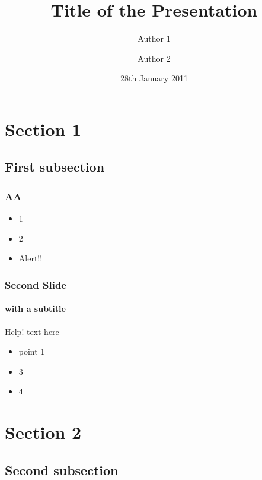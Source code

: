 \documentclass{beamer}
\title[Short Title]{Title of the Presentation}
\author[Auth. 1 \and Auth.2]{Author 1 \and Author 2}
\institute[UCL]{%
  Department of Statistical Science \\ %
  University College London
}
\date{28th January 2011}
\begin{document}
\begin{frame}
  \frametitle{}
  \titlepage
\end{frame}

\section{Section 1}
\subsection{First subsection}

\begin{frame}
  \frametitle{AA}
  \begin{itemize}
  \item 1
  \item 2
    \pause
  \item \alert{Alert!!}
  \end{itemize}
\end{frame}

\begin{frame}
  \frametitle{Second Slide}
  \framesubtitle{with a subtitle}
  \begin{alertblock}{Help!}
    text here
    \begin{itemize}
    \item point 1
    \end{itemize}
  \end{alertblock}
  
  \begin{example}
    \begin{itemize}
    \item 3
    \item 4
    \end{itemize}
  \end{example}
\end{frame}

\section{Section 2}
\subsection{Second subsection}

\end{document}
